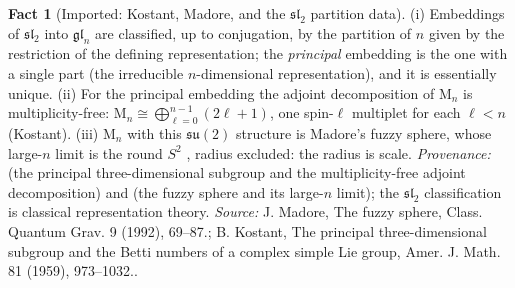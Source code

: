 \documentclass[11pt]{article}
\theoremstyle{definition}
\newtheorem{fact}[theorem]{Fact}
\theoremstyle{plain}
\providecommand{\Mat}{}\renewcommand{\Mat}{\mathrm{M}}
\begin{document}
\begin{fact}[Imported: Kostant, Madore, and the $\mathfrak{sl}_2$ partition data]\label{c:scrambling.imported-kostant-madore-partition-data}
(i) Embeddings of $\mathfrak{sl}_2$ into $\mathfrak{gl}_n$ are classified, up to conjugation, by the partition of $n$ given by the restriction of the defining representation; the \emph{principal} embedding is the one with a single part (the irreducible $n$-dimensional representation), and it is essentially unique. (ii) For the principal embedding the adjoint decomposition of $\Mat_n$ is multiplicity-free: $\Mat_n \cong \bigoplus_{\ell=0}^{n-1}(2\ell + 1)$, one spin-$\ell$ multiplet for each $\ell < n$ (Kostant). (iii) $\Mat_n$ with this $\mathfrak{su}(2)$ structure is Madore's fuzzy sphere, whose large-$n$ limit is the round $S^2$ \cite{Madore1992}, radius excluded: the radius is scale. \emph{Provenance:} \cite{Kostant1959} (the principal three-dimensional subgroup and the multiplicity-free adjoint decomposition) and \cite{Madore1992} (the fuzzy sphere and its large-$n$ limit); the $\mathfrak{sl}_2$ classification is classical representation theory.
\emph{Source:} J. Madore, The fuzzy sphere, Class. Quantum Grav. 9 (1992), 69--87.; B. Kostant, The principal three-dimensional subgroup and the Betti numbers of a complex simple Lie group, Amer. J. Math. 81 (1959), 973--1032..
\end{fact}
\end{document}
